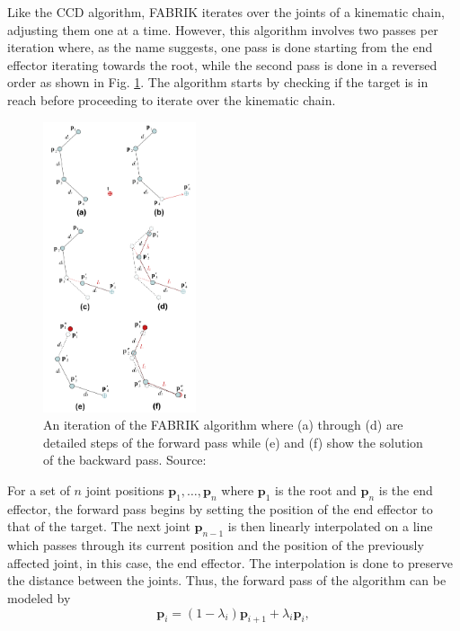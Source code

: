 Like the CCD algorithm, FABRIK iterates over the joints of a kinematic chain,
adjusting them one at a time. However, this algorithm involves two passes per
iteration where, as the name suggests, one pass is done starting from the end
effector iterating towards the root, while the second pass is done in a reversed
order as shown in Fig. \ref{fig:fabrik}. The algorithm starts by checking if the
target is in reach before proceeding to iterate over the kinematic chain. 

\begin{figure}[!h]
    \centering
    \captionsetup{justification=centering}
    \includegraphics[width=0.4\textwidth]{grafika/fabrik_iteration.png}
    \caption{An iteration of the FABRIK algorithm where (a) through (d) are
    detailed steps of the forward pass while (e) and (f) show the solution of
    the backward pass. Source: \cite{Aristidou2011}}
    \label{fig:fabrik}
\end{figure}

For a set of \(n\) joint positions \(\mathbf{p}_1, \dots, \mathbf{p}_n\) where
\(\mathbf{p}_1\) is the root and \(\mathbf{p}_n\) is the end effector, the forward pass
begins by setting the position of the end effector to that of the target. The
next joint \(\mathbf{p}_{n-1}\) is then linearly interpolated on a line which
passes through its current position and the position of the previously affected
joint, in this case, the end effector. The interpolation is done to preserve the
distance between the joints. Thus, the forward pass of the algorithm can be
modeled by 
\begin{equation}
    \mathbf{p}_i = (1 - \lambda_i)\mathbf{p}_{i+1} + \lambda_i \mathbf{p}_i,
\end{equation}

